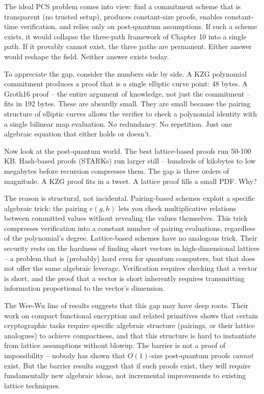 \documentclass[
  11pt,
  openany]{report}
\begin{document}
The ideal PCS problem comes into view: find a commitment scheme that is
transparent (no trusted setup), produces constant-size proofs, enables
constant-time verification, and relies only on post-quantum assumptions. If such
a scheme exists, it would collapse the three-path framework of Chapter 10 into a
single path. If it provably cannot exist, the three paths are permanent. Either
answer would reshape the field. Neither answer exists today.

To appreciate the gap, consider the numbers side by side. A KZG polynomial
commitment produces a proof that is a single elliptic curve point: 48 bytes. A
Groth16 proof -- the entire argument of knowledge, not just the commitment --
fits in 192 bytes. These are absurdly small. They are small because the pairing
structure of elliptic curves allows the verifier to check a polynomial identity
with a single bilinear map evaluation. No redundancy. No repetition. Just one
algebraic equation that either holds or doesn't.

Now look at the post-quantum world. The best lattice-based proofs run 50-100 KB.
Hash-based proofs (STARKs) run larger still -- hundreds of kilobytes to low
megabytes before recursion compresses them. The gap is three orders of
magnitude. A KZG proof fits in a tweet. A lattice proof fills a small PDF. Why?

The reason is structural, not incidental. Pairing-based schemes exploit a
specific algebraic trick: the pairing \(e(g, h)\) lets you check multiplicative
relations between committed values without revealing the values themselves. This
trick compresses verification into a constant number of pairing evaluations,
regardless of the polynomial's degree. Lattice-based schemes have no analogous
trick. Their security rests on the hardness of finding short vectors in
high-dimensional lattices -- a problem that is (probably) hard even for quantum
computers, but that does not offer the same algebraic leverage. Verification
requires checking that a vector is short, and the proof that a vector is short
inherently requires transmitting information proportional to the vector's
dimension.

The Wee-Wu line of results suggests that this gap may have deep roots. Their
work on compact functional encryption and related primitives shows that certain
cryptographic tasks require specific algebraic structure (pairings, or their
lattice analogues) to achieve compactness, and that this structure is hard to
instantiate from lattice assumptions without blowup. The barrier is not a proof
of impossibility -- nobody has shown that \(O(1)\)-size post-quantum proofs
\emph{cannot} exist. But the barrier results suggest that if such proofs exist,
they will require fundamentally new algebraic ideas, not incremental
improvements to existing lattice techniques.
\end{document}
